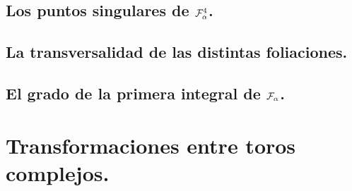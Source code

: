 \documentclass[10pt]{book}
\theoremstyle{definition}
\begin{document}
     	    

  	\section{Los puntos singulares de $\Fol[4]{\alpha}$.}

     	       
     	    
     	    

        \section{La transversalidad de las distintas foliaciones.}

            
        \section{El grado de la primera integral de $\Foli_{\alpha}$.}    
                
\appendix
\chapter{Transformaciones entre toros complejos.}
\label{ApendiceToros}        
            


\end{document}
